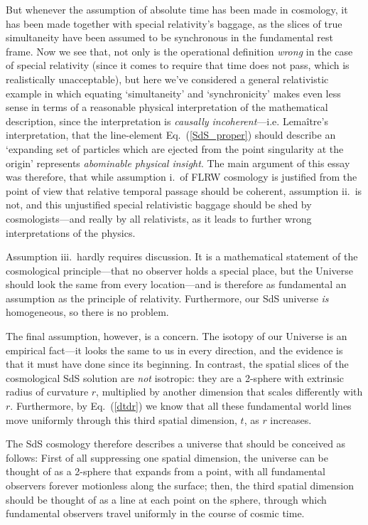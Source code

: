 \documentclass[11pt]{article}
\begin{document}
\begin{appendix}
But whenever the assumption of absolute time has been made in cosmology, it has been made together with special relativity's baggage, as the slices of true simultaneity have been assumed to be synchronous in the fundamental rest frame. Now we see that, not only is the operational definition \textit{wrong} in the case of special relativity (since it comes to require that time does not pass, which is realistically unacceptable), but here we've considered a general relativistic example in which equating `simultaneity' and `synchronicity' makes even less sense in terms of a reasonable physical interpretation of the mathematical description, since the interpretation is \textit{causally incoherent}---i.e. Lema\^{i}tre's interpretation, that the line-element Eq.~(\ref{SdS_proper}) should describe an `expanding set of particles which are ejected from the point singularity at the origin' represents \textit{abominable physical insight}. The main argument of this essay was therefore, that while assumption i.\ of FLRW cosmology is justified from the point of view that relative temporal passage should be coherent, assumption ii.\ is not, and this unjustified special relativistic baggage should be shed by cosmologists---and really by all relativists, as it leads to further wrong interpretations of the physics.

Assumption iii.\ hardly requires discussion. It is a mathematical statement of the cosmological principle---that no observer holds a special place, but the Universe should look the same from every location---and is therefore as fundamental an assumption as the principle of relativity. Furthermore, our SdS universe \textit{is} homogeneous, so there is no problem.

The final assumption, however, is a concern. The isotopy of our Universe is an empirical fact---it looks the same to us in every direction, and the evidence is that it must have done since its beginning. In contrast, the spatial slices of the cosmological SdS solution are \textit{not} isotropic: they are a 2-sphere with extrinsic radius of curvature $r$, multiplied by another dimension that scales differently with $r$. Furthermore, by Eq.~(\ref{dtdr}) we know that all these fundamental world lines move uniformly through this third spatial dimension, $t$, as $r$ increases. 

The SdS cosmology therefore describes a universe that should be conceived as follows: First of all suppressing one spatial dimension, the universe can be thought of as a 2-sphere that expands from a point, with all fundamental observers forever motionless along the surface; then, the third spatial dimension should be thought of as a line at each point on the sphere, through which fundamental observers travel uniformly in the course of cosmic time.


\end{appendix}
\end{document}
